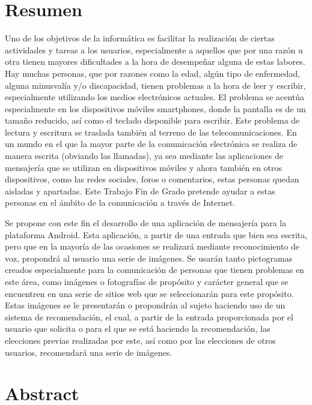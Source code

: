 \chapter{Resumen}

Uno de los objetivos de la informática es facilitar la realización de ciertas actividades y tareas a los usuarios, especialmente a aquellos que por una razón u otra tienen mayores dificultades a la hora de desempeñar alguna de estas labores. Hay muchas personas, que por razones como la edad, algún tipo de enfermedad, alguna minusvalía y/o discapacidad, tienen problemas a la hora de leer y escribir, especialmente utilizando los medios electrónicos actuales. El problema se acentúa especialmente en los dispositivos móviles smartphones, donde la pantalla es de un tamaño reducido, así como el teclado disponible para escribir. Este problema de lectura y escritura se traslada también al terreno de las telecomunicaciones. En un mundo en el que la mayor parte de la comunicación electrónica se realiza de manera escrita (obviando las llamadas), ya sea mediante las aplicaciones de mensajería que se utilizan en dispositivos móviles y ahora también en otros dispositivos, como las redes sociales, foros o comentarios, estas personas quedan aisladas y apartadas.  Este Trabajo Fin de Grado pretende ayudar a estas personas en el ámbito de la comunicación a través de Internet.


Se propone con este fin el desarrollo de una aplicación de mensajería para la plataforma Android. Esta aplicación, a partir de una entrada que bien sea escrita, pero que en la mayoría de las ocasiones se realizará mediante reconocimiento de voz, propondrá al usuario una serie de imágenes. Se usarán tanto pictogramas creados especialmente para la comunicación de personas que tienen problemas en este área, como imágenes o fotografías de propósito y carácter general que se encuentren en una serie de sitios web que se seleccionarán para este propósito. Estas imágenes se le presentarán o propondrán al sujeto haciendo uso de un sistema de recomendación, el cual, a partir de la entrada proporcionada por el usuario que solicita o para el que se está haciendo la recomendación, las elecciones previas realizadas por este, así como por las elecciones de otros usuarios, recomendará una serie de imágenes.


\chapter{Abstract}

